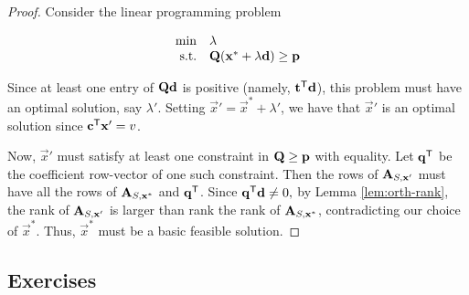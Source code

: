 \begin{proof}
Consider the linear programming problem

\begin{equation*}
\begin{array}{rl}
 \min & \lambda \\
\mbox{s.t.} & \mathbf{Q}(\mathbf{x}^*+\lambda \mathbf{d}) \geq \mathbf{p}
\end{array}
\end{equation*}

Since at least one entry of \(\mathbf{Q}\mathbf{d}\) is positive (namely,
\(\mathbf{t}^{\mathsf{T}}\mathbf{d}\)), this problem must have an optimal solution, say
\(\lambda'\). Setting \(\vec{x}' = \vec{x}^* + \lambda'\), we have that
\(\vec{x}'\) is an optimal solution since \(\mathbf{c}^{\mathsf{T}}\mathbf{x}' = v\).

Now, \(\vec{x}'\) must satisfy at least one constraint in
\(\mathbf{Q} \geq \mathbf{p}\) with equality. Let \(\mathbf{q}^{\mathsf{T}}\) be the
coefficient row-vector of one such constraint. Then the rows of
\(\mathbf{A}_{S,\mathbf{x}'}\) must have all the rows of
\(\mathbf{A}_{S,\mathbf{x}^*}\) and \(\mathbf{q}^{\mathsf{T}}\). Since
\(\mathbf{q}^{\mathsf{T}}\mathbf{d} \neq 0,\) by Lemma \ref{lem:orth-rank}, the rank of
\(\mathbf{A}_{S,\mathbf{x}'}\) is larger than rank the rank of
\(\mathbf{A}_{S,\mathbf{x}^*}\), contradicting our choice of \(\vec{x}^*\).
Thus, \(\vec{x}^*\) must be a basic feasible solution.
\end{proof}

\subsection*{Exercises}\label{exercises-8}

